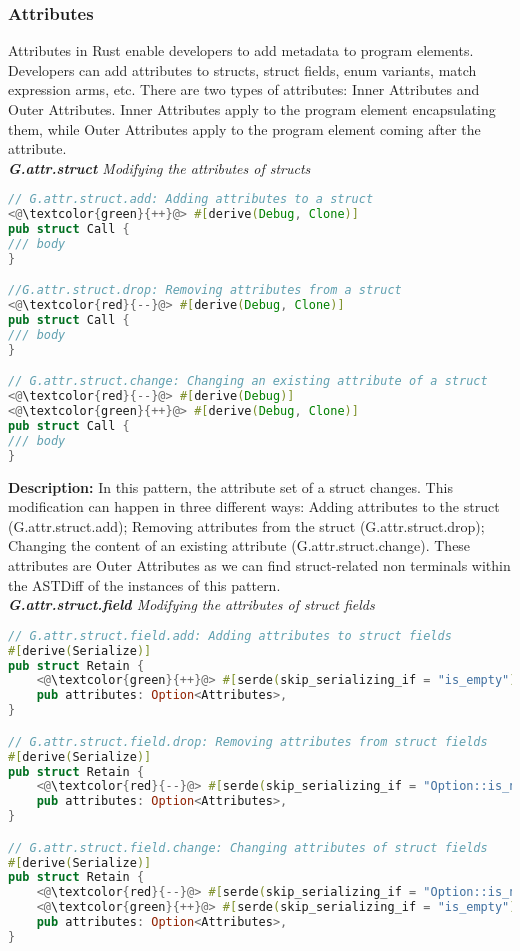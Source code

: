 \subsubsection{Attributes}

Attributes in Rust enable developers to add metadata to program elements. Developers can add attributes to structs, struct fields, enum variants, match expression arms, etc. There are two types of attributes: Inner Attributes and Outer Attributes. Inner Attributes apply to the program element encapsulating them, while Outer Attributes apply to the program element coming after the attribute. \\

\noindent\textit{\label{sec:G.attr.struct}\textbf{G.attr.struct} Modifying the attributes of structs}

\begin{lstlisting}[language=Rust, style=colouredRust]
// G.attr.struct.add: Adding attributes to a struct
<@\textcolor{green}{++}@> #[derive(Debug, Clone)]
pub struct Call {
/// body 
}

//G.attr.struct.drop: Removing attributes from a struct
<@\textcolor{red}{--}@> #[derive(Debug, Clone)]
pub struct Call {
/// body 
}

// G.attr.struct.change: Changing an existing attribute of a struct
<@\textcolor{red}{--}@> #[derive(Debug)]
<@\textcolor{green}{++}@> #[derive(Debug, Clone)]
pub struct Call {
/// body 
}
\end{lstlisting}

\noindent\textbf{Description:} In this pattern, the attribute set of a struct changes. This modification can happen in three different ways: Adding attributes to the struct (G.attr.struct.add); Removing attributes from the struct (G.attr.struct.drop); Changing the content of an existing attribute (G.attr.struct.change). These attributes are Outer Attributes as we can find struct-related non terminals within the ASTDiff of the instances of this pattern. \\

\noindent\textit{\textbf{G.attr.struct.field} Modifying the attributes of struct fields}

\begin{lstlisting}[language=Rust, style=colouredRust]
// G.attr.struct.field.add: Adding attributes to struct fields
#[derive(Serialize)]
pub struct Retain {
    <@\textcolor{green}{++}@> #[serde(skip_serializing_if = "is_empty")]
    pub attributes: Option<Attributes>,
}

// G.attr.struct.field.drop: Removing attributes from struct fields
#[derive(Serialize)]
pub struct Retain {
    <@\textcolor{red}{--}@> #[serde(skip_serializing_if = "Option::is_none")]
    pub attributes: Option<Attributes>,
}

// G.attr.struct.field.change: Changing attributes of struct fields
#[derive(Serialize)]
pub struct Retain {
    <@\textcolor{red}{--}@> #[serde(skip_serializing_if = "Option::is_none")]
    <@\textcolor{green}{++}@> #[serde(skip_serializing_if = "is_empty")]
    pub attributes: Option<Attributes>,
}
\end{lstlisting}

